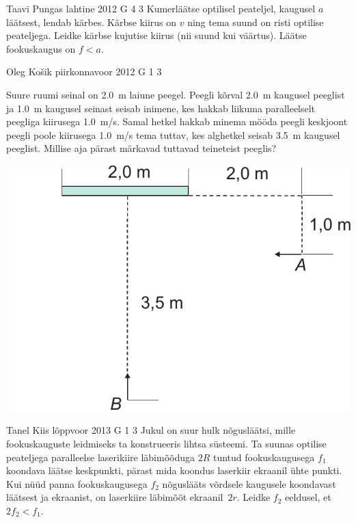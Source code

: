 \documentclass[11pt]{article}
\begin{document}
{{\begin{center}
\end{center}
\fi
}

{Taavi Pungas} %
{lahtine} %
{2012} %
{G 4} %
{3} %
{
\ifStatement
Kumerläätse optilisel peateljel, kaugusel $a$ läätsest, lendab kärbes.
Kärbse kiirus on $v$ ning tema suund on risti optilise peateljega.
Leidke kärbse kujutise kiirus (nii suund kui väärtus). Läätse
fookuskaugus on $f < a$.
\fi
}

{Oleg Košik} %
{piirkonnavoor} %
{2012} %
{G 1} %
{3} %
{
\ifStatement
Suure ruumi seinal on \SI{2,0}{m} laiune peegel. Peegli kõrval \SI{2,0}{m}
kaugusel peeglist ja \SI{1,0}{m} kaugusel seinast seisab inimene, kes hakkab
liikuma paralleelselt peegliga kiirusega \SI{1,0}{m/s}. Samal hetkel hakkab
minema mööda peegli keskjoont peegli poole kiirusega \SI{1,0}{m/s} tema tuttav,
kes alghetkel seisab \SI{3,5}{m} kaugusel peeglist. Millise aja pärast
märkavad tuttavad teineteist peeglis?

\begin{center}
\includegraphics[width=0.5\linewidth]{2012-v2g-01-peegel2}%
\end{center}
\fi
}

{Tanel Kiis} %
{lõppvoor} %
{2013} %
{G 1} %
{3} %
{
\ifStatement
Jukul on suur hulk nõgusläätsi, mille fookuskauguste leidmiseks ta konstrueeris lihtsa
süsteemi. Ta suunas optilise peateljega paralleelse
laserikiire läbimõõduga $2R$ tuntud fookuskaugusega
$f_1$ koondava läätse keskpunkti, pärast mida koondus laserkiir ekraanil ühte punkti. Kui nüüd panna
fookuskaugusega $f_2$ nõguslääts võrdsele kaugusele koondavast läätsest ja
ekraanist, on laserkiire läbimõõt ekraanil~$2r$. Leidke $f_2$ eeldusel, et~$2f_2 < f_1$.
\fi
}

}
\end{document}
